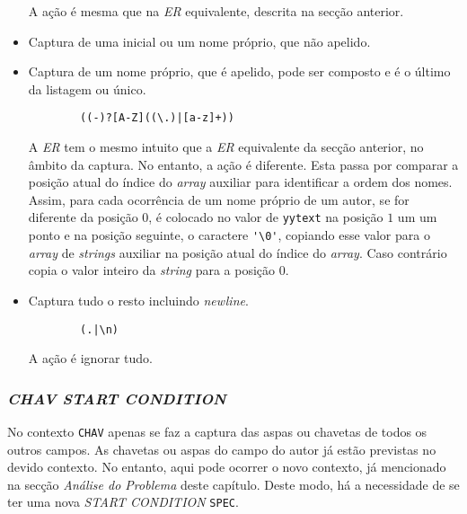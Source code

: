 \begin{itemize}
		 A ação é mesma que na \emph{ER} equivalente, descrita na secção anterior.

	 \item Captura de uma inicial ou um nome próprio, que não apelido.

	 \item Captura de um nome próprio, que é apelido, pode ser composto
		 e é o último da listagem ou único.
    \begin{verbatim}
		((-)?[A-Z]((\.)|[a-z]+))
    \end{verbatim}
		A \emph{ER} tem o mesmo intuito que a \emph{ER} equivalente da secção
		anterior, no âmbito da captura. No entanto, a ação é diferente.
		Esta passa por comparar a posição atual do índice do \emph{array} auxiliar
		para identificar a ordem dos nomes. Assim, para cada ocorrência de um nome
		próprio de um autor, se for diferente da posição $0$, é colocado no valor de
		\texttt{yytext} na posição $1$ um um ponto e na posição seguinte,
		o caractere \verb|'\0'|, copiando esse valor para o \emph{array} de
		\emph{strings} auxiliar na posição atual do índice do \emph{array}. Caso
		contrário copia o valor inteiro da \emph{string} para a posição $0$.

	 \item Captura tudo o resto incluindo \emph{newline}.
    \begin{verbatim}
		(.|\n)
    \end{verbatim}
	A ação é ignorar tudo.


\end{itemize}


\subsubsection{\emph{CHAV \emph{START CONDITION}}}

No contexto \texttt{CHAV} apenas se faz a captura das aspas ou chavetas de todos
os outros campos. As chavetas ou aspas do campo do autor já estão previstas  no
devido contexto. No entanto, aqui pode ocorrer o novo contexto, já mencionado na
secção \emph{Análise do Problema} deste capítulo. Deste modo, há a necessidade
de se ter uma nova \emph{START CONDITION} \texttt{SPEC}.



